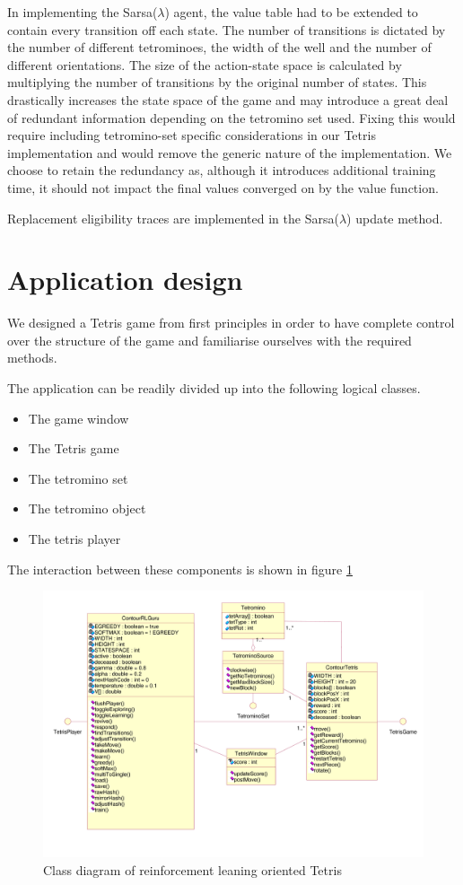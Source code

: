 \documentclass{rucsthesis}
\begin{document}
In implementing the Sarsa($\lambda$) agent, the value table had to be extended to contain every transition off each state. The number of transitions is dictated by the number of different tetrominoes, the width of the well and the number of different orientations.  The size of the action-state space is calculated by multiplying the number of transitions by the original number of states. This drastically increases the state space of the game and may introduce a great deal of redundant information depending on the tetromino set used. Fixing this would require including tetromino-set specific considerations in our Tetris implementation and would remove the generic nature of the implementation. We choose to retain the redundancy as, although it introduces additional training time, it should not impact the final values converged on by the value function.

Replacement eligibility traces are implemented in the Sarsa($\lambda$) update method. 

\section{Application design}

We designed a Tetris game from first principles in order to have complete control over the structure of the game and familiarise ourselves with the required methods.

The application can be readily divided up into the following logical classes.

\begin{itemize}
\item{The game window}
\item{The Tetris game}
\item{The tetromino set}
\item{The tetromino object}
\item{The tetris player}
\end{itemize}

The interaction between these components is shown in figure \ref{fig:uml}

\begin{figure}[h]
\centering
\includegraphics[width=6in]{finaluml.png}
\caption{Class diagram of reinforcement leaning oriented Tetris}
\label{fig:uml}
\end{figure}
\end{document}
